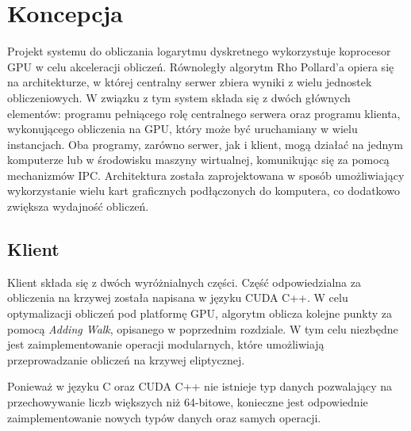 \newpage
\section{Koncepcja}

Projekt systemu do obliczania logarytmu dyskretnego wykorzystuje koprocesor GPU w celu akceleracji obliczeń.
Równoległy algorytm Rho Pollard'a opiera się na architekturze, w której centralny serwer zbiera wyniki
z wielu jednostek obliczeniowych. W związku z tym system składa się z dwóch głównych elementów:
programu pełniącego rolę centralnego serwera oraz programu klienta, wykonującego obliczenia na GPU,
który może być uruchamiany w wielu instancjach.
Oba programy, zarówno serwer, jak i klient, mogą działać na jednym komputerze
lub w środowisku maszyny wirtualnej, komunikując się za pomocą mechanizmów IPC.
Architektura została zaprojektowana w sposób umożliwiający wykorzystanie wielu kart graficznych
podłączonych do komputera, co dodatkowo zwiększa wydajność obliczeń.

\subsection{Klient}
Klient składa się z dwóch wyróżnialnych części.
Część odpowiedzialna za obliczenia na krzywej została napisana w języku
CUDA C++. W celu optymalizacji obliczeń pod platformę GPU, algorytm oblicza
kolejne punkty za pomocą \textit{Adding Walk}, opisanego w poprzednim
rozdziale. W tym celu niezbędne jest zaimplementowanie operacji modularnych,
które umożliwiają przeprowadzanie obliczeń na krzywej eliptycznej.

Ponieważ w języku C oraz CUDA C++ nie istnieje typ danych pozwalający na
przechowywanie liczb większych niż 64-bitowe, konieczne jest odpowiednie
zaimplementowanie nowych typów danych oraz samych operacji.

